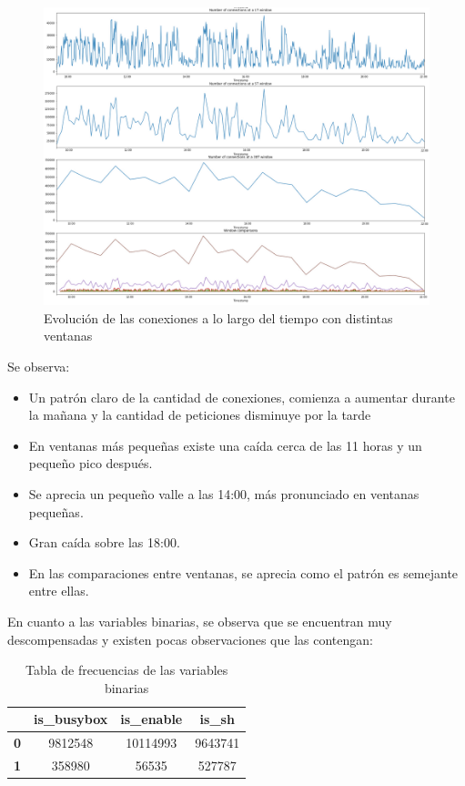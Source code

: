 \begin{figure}[H]
    \centering
    \includegraphics[width=17.5cm]{figs/daily_connections.PNG}
    \caption{Evolución de las conexiones a lo largo del tiempo con distintas ventanas}
    \label{fig:dailyconn}
\end{figure}

Se observa:

\begin{itemize}
    \item Un patrón claro de la cantidad de conexiones, comienza a aumentar durante la mañana y la cantidad de peticiones disminuye por la tarde
    \item En ventanas más pequeñas existe una caída cerca de las 11 horas y un pequeño pico después.
    \item Se aprecia un pequeño valle a las 14:00, más pronunciado en ventanas pequeñas.
    \item Gran caída sobre las 18:00.
    \item En las comparaciones entre ventanas, se aprecia como el patrón es semejante entre ellas.
\end{itemize}

En cuanto a las variables binarias, se observa que se encuentran muy descompensadas y existen pocas observaciones que las contengan:

\begin{table}[H]
    \centering
    \begin{tabular}{|c|c|c|c|}
    \hline
    \; & is\_busybox & is\_enable & is\_sh \\ [0.5ex]
    \hline
        \textbf{0} & 9812548 & 10114993 & 9643741 \\
        \textbf{1} & 358980 & 56535 & 527787 \\ [1ex]
    \hline
    \end{tabular}
    \caption{Tabla de frecuencias de las variables binarias}
    \label{tab:bintable}
\end{table}

